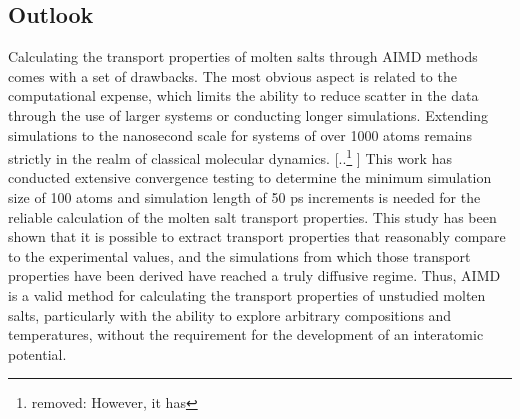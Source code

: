 \documentclass[review]{elsarticle}
\providecommand{\DIFaddtex}[1]{{\protect\color{blue} \sf #1}} %
\providecommand{\DIFdeltex}[1]{{\protect\color{red} [..\footnote{removed: #1} ]}} %
\providecommand{\DIFaddbegin}{} %
\providecommand{\DIFaddend}{} %
\providecommand{\DIFdelbegin}{} %
\providecommand{\DIFdelend}{} %
\providecommand{\DIFadd}[1]{\texorpdfstring{\DIFaddtex{#1}}{#1}} %
\providecommand{\DIFdel}[1]{\texorpdfstring{\DIFdeltex{#1}}{}} %
\newcommand{\DIFscaledelfig}{0.5}
\newlength{\DIFdelgraphicswidth} %
\newlength{\DIFdelgraphicsheight} %
\newcommand{\DIFaddincludegraphics}[2][]{{\color{blue}\fbox{\DIFOincludegraphics[#1]{#2}}}} %
\newcommand{\DIFdelincludegraphics}[2][]{%
\sbox{\DIFdelgraphicsbox}{\DIFOincludegraphics[#1]{#2}}%
\settoboxwidth{\DIFdelgraphicswidth}{\DIFdelgraphicsbox} %
\settoboxtotalheight{\DIFdelgraphicsheight}{\DIFdelgraphicsbox} %
\scalebox{\DIFscaledelfig}{%
\parbox[b]{\DIFdelgraphicswidth}{\usebox{\DIFdelgraphicsbox}\\[-\baselineskip] \rule{\DIFdelgraphicswidth}{0em}}\llap{\resizebox{\DIFdelgraphicswidth}{\DIFdelgraphicsheight}{%
\setlength{\unitlength}{\DIFdelgraphicswidth}%
\begin{picture}(1,1)%
\thicklines\linethickness{2pt} %
{\color[rgb]{1,0,0}\put(0,0){\framebox(1,1){}}}%
{\color[rgb]{1,0,0}\put(0,0){\line( 1,1){1}}}%
{\color[rgb]{1,0,0}\put(0,1){\line(1,-1){1}}}%
\end{picture}%
}\hspace*{3pt}}} %
} %
\DeclareRobustCommand{\DIFaddbegin}{\DIFOaddbegin \let\includegraphics\DIFaddincludegraphics} %
\DeclareRobustCommand{\DIFaddend}{\DIFOaddend \let\includegraphics\DIFOincludegraphics} %
\DeclareRobustCommand{\DIFdelbegin}{\DIFOdelbegin \let\includegraphics\DIFdelincludegraphics} %
\DeclareRobustCommand{\DIFdelend}{\DIFOaddend \let\includegraphics\DIFOincludegraphics} %
\begin{document}
\subsection{Outlook}
Calculating the transport properties of molten salts through AIMD methods comes with a set of drawbacks. The most obvious aspect is related to the computational expense, which limits the ability to reduce scatter in the data through the use of larger systems or conducting longer simulations. Extending simulations to the nanosecond scale for systems of over 1000 atoms remains strictly in the realm of classical molecular dynamics. \DIFdelbegin \DIFdel{However, it has }\DIFdelend \DIFaddbegin \DIFadd{This work has conducted extensive convergence testing to determine the minimum simulation size of 100 atoms and simulation length of 50 ps increments is needed for the reliable calculation of the molten salt transport properties. This study has }\DIFaddend been shown that it is possible to extract transport properties that reasonably compare to the experimental values, and the simulations from which those transport properties have been derived have reached a truly diffusive regime. Thus, AIMD is a valid method for calculating the transport properties of unstudied molten salts, particularly with the ability to explore arbitrary compositions and temperatures, without the requirement for the development of an interatomic potential. 

\FloatBarrier
\end{document}
